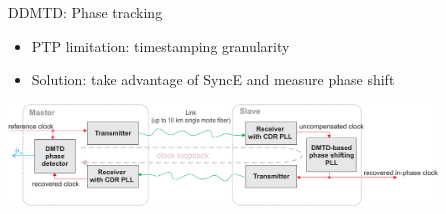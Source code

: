 \documentclass[compress,red]{beamer}
\begin{document}
\begin{frame}{DDMTD: Phase tracking}

\small
    \begin{itemize}
      \item PTP limitation: timestamping granularity
      \item Solution: take advantage of SyncE and measure phase shift
    \end{itemize}

  \begin{center}
  \includegraphics[height=2.7cm]{misc/phase_tracking.pdf}
  \end{center}

\end{frame}
\end{document}
